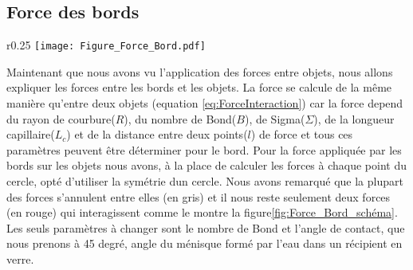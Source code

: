         \subsection{Force des bords}
            \begin{wrapfigure}{r}{0.25\textwidth}
            \centering
                \texttt{[image: Figure\_Force\_Bord.pdf]}
                \caption{Schéma des forces des bords.}
                \label{fig:Force_Bord_schéma}
            \end{wrapfigure}
            Maintenant que nous avons vu l'application des forces entre objets, nous allons expliquer les forces entre les bords et les objets. La force se calcule de la même manière qu'entre deux objets (equation \ref{eq:ForceInteraction}) car la force depend du rayon de courbure($R$), du nombre de Bond($B$), de Sigma($\Sigma$), de la longueur capillaire($L_c$) et de la distance entre deux points($l$) de force et tous ces paramètres peuvent être déterminer pour le bord. Pour la force appliquée par les bords sur les objets nous avons, à la place de calculer les forces à chaque point du cercle, opté d'utiliser la symétrie dun cercle. Nous avons remarqué que la plupart des forces s'annulent entre elles (en gris) et il nous reste seulement deux forces (en rouge) qui interagissent comme le montre la figure\ref{fig:Force_Bord_schéma}. Les seuls paramètres à changer sont le nombre de Bond et l'angle de contact, que nous prenons à 45 degré, angle du ménisque formé par l'eau dans un récipient en verre. 
